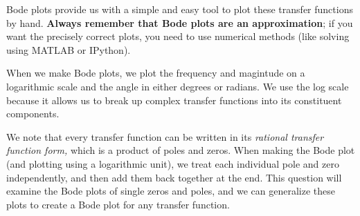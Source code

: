 
Bode plots provide us with a simple and easy tool to plot these transfer functions by hand. \textbf{Always remember that Bode plots are an approximation}; if you want the precisely correct plots, you need to use numerical methods (like solving using MATLAB or IPython).

When we make Bode plots, we plot the frequency and magintude on a logarithmic scale
and the angle in either degrees or radians. We use the log scale because it allows us to break up complex transfer functions into its constituent components. 

We note that every transfer function can be written in its \textit{rational transfer function form,} which is a product of poles and zeros. When making the Bode plot (and plotting using a logarithmic unit), we treat each individual pole and zero independently, and then add them back together at the end. This question will examine the Bode plots of single zeros and poles, and we can generalize these plots to create a Bode plot for any transfer function.

